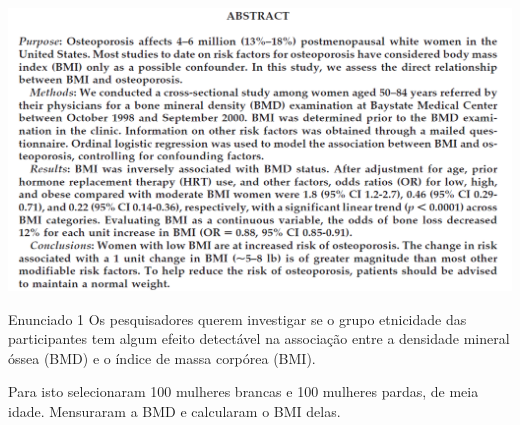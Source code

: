 \documentclass{beamer}
\begin{document}
\begin{frame}{\scriptsize }
  \begin{center}
    \includegraphics[width=1.175\textwidth]{Cap18-19/bmi-bmd-abstract}
  \end{center}
\end{frame}

\begin{frame}{\scriptsize }
  \begin{exampleblock}{Enunciado 1}
    \footnotesize
    Os pesquisadores querem investigar se o grupo etnicidade das participantes tem algum efeito detectável na associação entre
    a densidade mineral óssea (BMD) e o índice de massa corpórea (BMI).

    \bigskip
    \begin{exampleblock}{}
    \footnotesize
    Para isto selecionaram 100 mulheres brancas e 100 mulheres pardas, de meia idade.
    Mensuraram a BMD e calcularam o BMI delas.
  \end{exampleblock}

  \end{exampleblock}
\end{frame}
\end{document}

